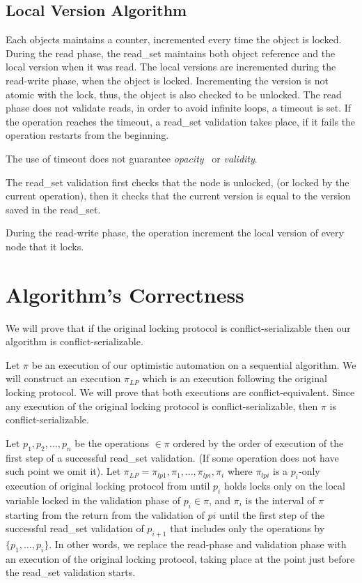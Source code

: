 \documentclass{article}
\newcommand{\code}[1]{\textsf{#1}}
\newcommand{\readSet}{\code{read\_set}\xspace}
\begin{document}

\subsection{Local Version Algorithm} 
Each objects maintains a counter, incremented every time the 
object is locked. During the read phase, the \readSet maintains
both object reference and the local version when it was read.
The local versions are incremented during the read-write phase,
when the object is locked. Incrementing the version is not atomic 
with the lock, thus, the object is also checked to be unlocked. 
The read phase does not validate reads, in order to avoid infinite
loops, a timeout is set. If the operation reaches the timeout, 
a \readSet validation takes place, if it fails the operation
restarts from the beginning. 

The use of timeout does not guarantee
\emph{opacity}~\cite{GuerraouiK2008} or 
\emph{validity}\cite{LevAriCK2014}. 



The \readSet validation first checks that the node is unlocked,
(or locked by the current operation), then it checks that the 
current version is equal to the version saved in the \readSet. 

During the read-write phase, the operation increment the local 
version of every node that it locks. 
 
\section{Algorithm's Correctness} 
We will prove that if the original locking protocol is 
conflict-serializable then our algorithm is conflict-serializable.

Let $\pi$ be an execution of our optimistic automation on a 
sequential algorithm. We will construct an execution $\pi_{LP}$ 
which is an execution following the original locking protocol. 
We will prove that both executions are conflict-equivalent. 
Since any execution of the original locking protocol
is conflict-serializable, then $\pi$ is conflict-serializable. 

Let $p_1,p_2,\ldots,p_n$ be the operations $\in\pi$ ordered by the 
order of execution of the first step of a successful \readSet 
validation. (If some operation does not have such point we omit it).
Let $\pi_{LP} = \pi_{lp1},\pi_{1},\ldots,\pi_{lpi},\pi_{i}$ where 
$\pi_{lpi}$ is a $p_i$-only execution of original locking protocol 
from until $p_i$ holds locks only on the local variable locked
in the validation phase of $p_i \in \pi$, and $\pi_i$ is
the interval of $\pi$ starting from the return from the validation of
$pi$ until the first step of the successful \readSet validation of 
$p_{i+1}$ that includes only the operations by $\{p_1,\ldots,p_i\}$.
In other words, we replace the read-phase and validation phase with 
an execution of the original locking protocol, 
taking place at the point just before the \readSet validation starts. 
\end{document}
